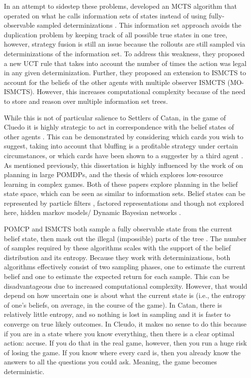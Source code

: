 \documentclass[msc, deptreport, ai, romanprepages]{infthesis}
\begin{document}
In an attempt to sidestep these problems, \cite{Cowling} developed an MCTS algorithm that operated on what he calls information sets of states instead of using fully-observable sampled determinizations \cite{Cowling}. This information set approach avoids the duplication problem by keeping track of all possible true states in one tree, however, strategy fusion is still an issue because the rollouts are still sampled via determinizations of the information set. To address this weakness, they proposed a new UCT rule that takes into account the number of times the action was legal in any given determinization. Further, they proposed an extension to ISMCTS to account for the beliefs of the other agents with multiple observer ISMCTS (MO-ISMCTS). However, this increases computational complexity because of the need to store and reason over multiple information set trees. 

While this is not of particular salience to Settlers of Catan, in the game of Cluedo it is highly strategic to act in correspondence with the belief states of other agents \cite{Mihai}. This can be demonstrated by considering which cards you wish to suggest, taking into account that bluffing is a profitable strategy under certain circumstances, or which cards have been shown to a suggester by a third agent \cite{IPP}. As mentioned previously, this dissertation is highly influenced by the work of \cite{Silver-veness} on planning in large POMDPs, and the thesis of \cite{Mihai} which explores low-resource learning in complex games. Both of these papers explore planning in the belief state space, which can be seen as similar to information sets. Belief states can be represented by particle filters \cite{Silver-veness}, factored representations \cite{Mihai} and though not explored here, hidden markov models/ Dynamic Bayesian networks \cite{Russell-norvig}. 

POMCP and ISMCTS both sample a fully observable state from the current belief state, then mask out the illegal (impossible) parts of the tree \cite{Mihai}. The number of samples required by these algorithms scales with the support of the belief distribution and its entropy. Because they work with determinizations, both algorithms effectively consist of two sampling phases, one to estimate the current belief and one to estimate the expected return for each sample. This can be disadvantageous due to increased computational complexity. However, that would depend on how uncertain one is about what the current state is (i.e., the entropy of one's beliefs, on average, in the course of the game). In Catan, there is relatively little entropy, and so nothing is lost in sampling and it is faster to converge on true likely outcomes. In Cleudo, it makes no sense to do this because if you are in a state where you know everything, then there is a clear optimal action: accuse. If you do that in the real game, however, then you run a huge risk of losing the game. If you know where every card is, then you already know the answers to all the questions you could ask. Meaning, the game becomes deterministic. 
\end{document}
